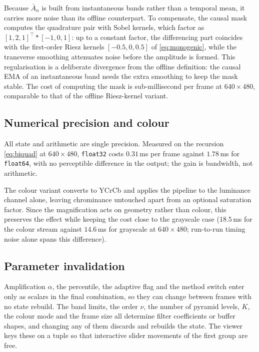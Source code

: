 \documentclass[conference]{IEEEtran}
\begin{document}
Because $\bar{A}_n$ is built from instantaneous bands rather than a temporal
mean, it carries more noise than its offline counterpart. To compensate, the
causal mask computes the quadrature pair with Sobel kernels, which factor as
$[1,2,1]^{\!\top}\ast[-1,0,1]$: up to a constant factor, the differencing part
coincides with the first-order Riesz kernels $[-0.5,0,0.5]$ of
\eqref{eq:monogenic}, while the transverse smoothing attenuates noise before
the amplitude is formed. This regularisation is a deliberate divergence from
the offline definition: the causal EMA of an instantaneous band needs the
extra smoothing to keep the mask stable. The cost of computing the mask is
sub-millisecond per frame at $640\times480$, comparable to that of the offline
Riesz-kernel variant.

\subsection{Numerical precision and colour}

All state and arithmetic are single precision. Measured on the recursion
\eqref{eq:biquad} at $640\times480$, \texttt{float32} costs $0.31$\,ms per frame
against $1.78$\,ms for \texttt{float64}, with no perceptible difference in the
output; the gain is bandwidth, not arithmetic.

The colour variant converts to YCrCb and applies the pipeline to the luminance
channel alone, leaving chrominance untouched apart from an optional saturation
factor. Since the magnification acts on geometry rather than colour, this
preserves the effect while keeping the cost close to the grayscale case
($18.5$\,ms for the colour stream against $14.6$\,ms for grayscale at
$640\times480$; run-to-run timing noise alone spans this difference).

\subsection{Parameter invalidation}

Amplification $\alpha$, the percentile, the adaptive flag and the method switch
enter only as scalars in the final combination, so they can change between
frames with no state rebuild. The band limits, the order $\nu$, the number of
pyramid levels, $K$, the colour mode and the frame size all determine filter
coefficients or buffer shapes, and changing any of them discards and rebuilds
the state. The viewer keys these on a tuple so that interactive slider
movements of the first group are free.
\end{document}
